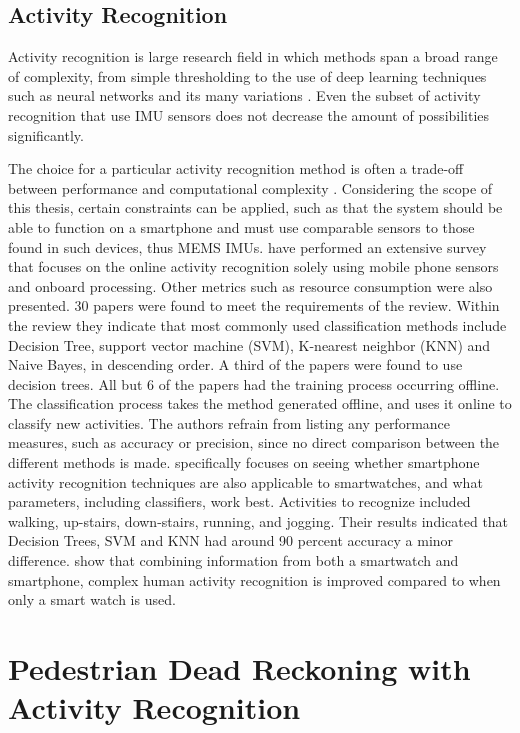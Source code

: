 \subsection{Activity Recognition}
Activity recognition is large research field in which methods span a broad range of complexity, from simple thresholding to the use of deep learning techniques such as neural networks and its many variations \cite{Lima2019}. Even the subset of activity recognition that use IMU sensors does not decrease the amount of possibilities significantly.


The choice for a particular activity recognition method is often a trade-off between performance and computational complexity \cite{Bulling2014}. Considering the scope of this thesis, certain constraints can be applied, such as that the system should be able to function on a smartphone and must use comparable sensors to those found in such devices, thus MEMS IMUs. \citet{Shoaib2015} have performed an extensive survey that focuses on the online activity recognition solely using mobile phone sensors and onboard processing. Other metrics such as resource consumption were also presented. 30 papers were found to meet the requirements of the review. Within the review they indicate that most commonly used classification methods include Decision Tree, support vector machine (SVM), K-nearest neighbor (KNN) and Naive Bayes, in descending order. A third of the papers were found to use decision trees. All but 6 of the papers had the training process occurring offline. The classification process takes the method generated offline, and uses it online to classify new activities. The authors refrain from listing any performance measures, such as accuracy or precision, since no direct comparison between the different methods is made. \citet{Ahmad2020} specifically focuses on seeing whether smartphone activity recognition techniques are also applicable to smartwatches, and what parameters, including classifiers, work best. Activities to recognize included walking, up-stairs, down-stairs, running, and jogging. Their results indicated that  Decision Trees, SVM and KNN had around 90 percent accuracy a minor difference. \citet{Shoaib2016} show that combining information from both a smartwatch and smartphone, complex human activity recognition is improved compared to when only a smart watch is used. 

\section{Pedestrian Dead Reckoning with Activity Recognition}

